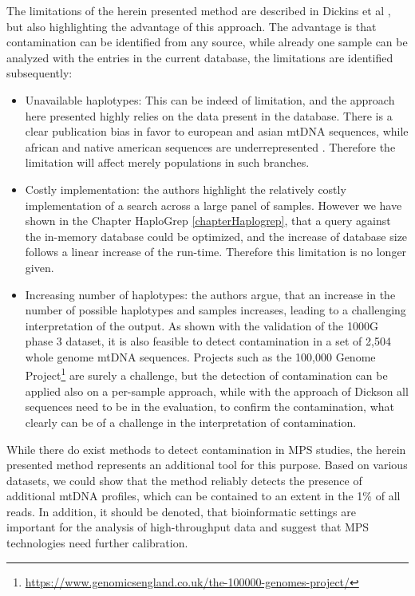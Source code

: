 The limitations of the herein presented method are described in Dickins et al \cite{Dickins2014}, but also highlighting the advantage of this approach. The advantage is that contamination can be identified from any source, while already one sample can be analyzed with the entries in the current database, the limitations are identified subsequently:
\begin{itemize}
\item Unavailable haplotypes: This can be indeed of limitation, and the approach here presented highly relies on the data present in the database. There is a clear publication bias in favor to european and asian mtDNA sequences, while african and native american sequences are underrepresented \cite{Fendt2011}. Therefore the limitation will affect merely populations in such branches. 
\item Costly implementation: the authors highlight the relatively costly implementation of a search across a large panel of samples. However we have shown in the Chapter HaploGrep \ref{chapterHaplogrep}, that a query against the in-memory database could be optimized, and the increase of database size follows a linear increase of the run-time. Therefore this limitation is no longer given.
\item Increasing number of haplotypes: the authors argue, that an increase in the number of possible haplotypes and samples increases, leading to a challenging interpretation of the output. As shown with the validation of the 1000G phase 3 dataset, it is also feasible to detect contamination in a set of 2,504 whole genome mtDNA sequences. Projects such as the 100,000 Genome Project\footnote{\url{https://www.genomicsengland.co.uk/the-100000-genomes-project/}} are surely a challenge, but the detection of contamination can be applied also on a per-sample approach, while with the approach of Dickson all sequences need to be in the evaluation, to confirm the contamination, what clearly can be of a challenge in the interpretation of contamination. 
\end{itemize}

While there do exist methods to detect contamination in MPS studies, the herein presented method represents an additional tool for this purpose. Based on various datasets, we could show that the method reliably detects the presence of additional mtDNA profiles, which can be contained to an extent in the 1\% of all reads. 
In addition, it should be denoted, that bioinformatic settings are important for the analysis of high-throughput data and suggest that MPS technologies need further calibration.

